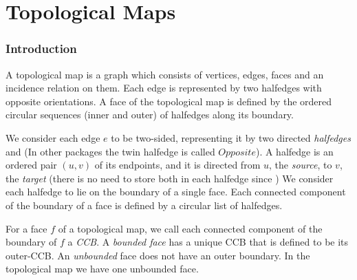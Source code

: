 

\chapter{Topological Maps}


\subsection*{Introduction}

A topological map is a graph which consists of vertices,
edges, faces and an incidence relation on them.
Each edge is represented by two halfedges with opposite orientations.
A face of the topological map is defined by the ordered
circular sequences 
(inner and outer) of halfedges along its boundary.

We consider each edge $e$ to be two-sided, representing it by two
directed {\em halfedges}  and 
(In other packages the twin halfedge is called $Opposite$).  
A halfedge  is an ordered pair $(u,v)$ of its endpoints, and
it is directed from $u$, the {\em source}, to $v$, the {\em target} (there 
is no need to store both in each halfedge since 
%
)
We consider each halfedge to lie on the boundary of a single face.
Each connected component of the boundary of a face is %
defined by a
circular list of halfedges. 

For a face $f$ of a topological map, 
we call each
connected component of the boundary of $f$ a {\em CCB}.
A {\em bounded face} has a
unique CCB that is defined to be
its outer-CCB. An
{\em unbounded} face does not have an outer boundary.
In the topological map we have one unbounded face.

